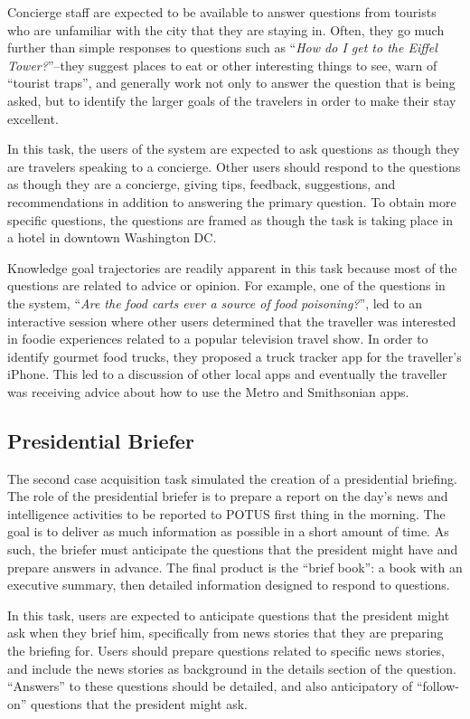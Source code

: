 \documentclass[11pt,letterpaper]{article}
\begin{document}
Concierge staff are expected to be available to answer questions from tourists who are unfamiliar with the city that they are staying in. Often, they go much further than simple responses to questions such as ``\textit{How do I get to the Eiffel Tower?}''--they suggest places to eat or other interesting things to see, warn of ``tourist traps'', and generally work not only to answer the question that is being asked, but to identify the larger goals of the travelers in order to make their stay excellent.

In this task, the users of the system are expected to ask questions as though they are travelers speaking to a concierge. Other users should respond to the questions as though they are a concierge, giving tips, feedback, suggestions, and recommendations in addition to answering the primary question. To obtain more specific questions, the questions are framed as though the task is taking place in a hotel in downtown Washington DC.

Knowledge goal trajectories are readily apparent in this task because most of the questions are related to advice or opinion. For example, one of the questions in the system, ``\textit{Are the food carts ever a source of food poisoning?}'', led to an interactive session where other users determined that the traveller was interested in foodie experiences related to a popular television travel show. In order to identify gourmet food trucks, they proposed a truck tracker app for the traveller's iPhone. This led to a discussion of other local apps and eventually the traveller was receiving advice about how to use the Metro and Smithsonian apps.

\subsection{Presidential Briefer}

The second case acquisition task simulated the creation of a presidential briefing. The role of the presidential briefer is to prepare a report on the day's news and intelligence activities to be reported to POTUS first thing in the morning. The goal is to deliver as much information as possible in a short amount of time. As such, the briefer must anticipate the questions that the president might have and prepare answers in advance. The final product is the ``brief book'': a book with an executive summary, then detailed information designed to respond to questions.

In this task, users are expected to anticipate questions that the president might ask when they brief him, specifically from news stories that they are preparing the briefing for. Users should prepare questions related to specific news stories, and include the news stories as background in the details section of the question. ``Answers'' to these questions should be detailed, and also anticipatory of ``follow-on'' questions that the president might ask.
\end{document}
